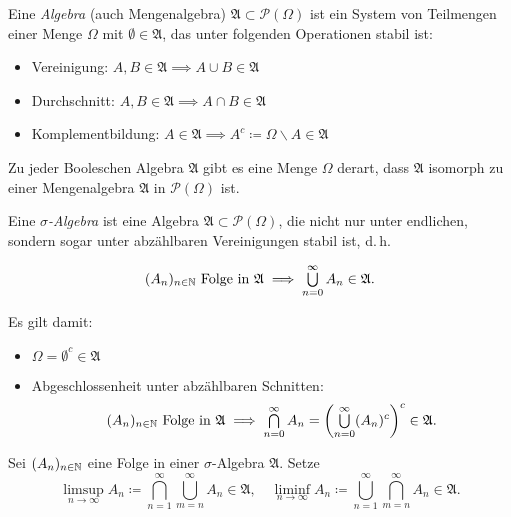 \documentclass{cheat-sheet}
\begin{document}
\begin{defn}
  Eine \emph{Algebra} (auch Mengenalgebra) $\mathfrak{A} \subset \mathcal{P}(\Omega)$ ist ein System von Teilmengen einer Menge $\Omega$ mit $\emptyset \in \mathfrak{A}$, das unter folgenden Operationen stabil ist:
  \begin{itemize}
    \item Vereinigung: $A, B \in \mathfrak{A} \implies A \cup B \in \mathfrak{A}$
    \item Durchschnitt: $A, B \in \mathfrak{A} \implies A \cap B \in \mathfrak{A}$
    \item Komplementbildung: $A \in \mathfrak{A} \implies A^c \coloneqq \Omega \backslash A \in \mathfrak{A}$
  \end{itemize}
\end{defn}

\begin{satz}
Zu jeder Booleschen Algebra $\mathfrak{A}$ gibt es eine Menge $\Omega$ derart, dass $\mathfrak{A}$ isomorph zu einer Mengenalgebra $\mathfrak{A}$ in $\mathcal{P}(\Omega)$ ist.
\end{satz}

\begin{defn}
  Eine \emph{$\sigma$-Algebra} ist eine Algebra $\mathfrak{A} \subset \mathcal{P}(\Omega)$, die nicht nur unter endlichen, sondern sogar unter abzählbaren Vereinigungen stabil ist, d.\,h.

  \[ (A_n)_{n \in \N} \text{ Folge in } \mathfrak{A} \implies \bigcup_{n = 0}^{\infty} A_n \in \mathfrak{A}. \]
\end{defn}

\begin{bem}
  Es gilt damit:

  \begin{itemize}
    \item $\Omega = \emptyset^c \in \mathfrak{A}$
    \item Abgeschlossenheit unter abzählbaren Schnitten:
  \[ (A_n)_{n \in \N} \text{ Folge in } \mathfrak{A} \implies \bigcap_{n = 0}^{\infty} A_n = \left( \bigcup_{n = 0}^{\infty} (A_n)^c \right)^c \in \mathfrak{A}. \]
  \end{itemize}
\end{bem}

\begin{defn}
  Sei $(A_n)_{n \in \mathbb{N}}$ eine Folge in einer $\sigma$-Algebra $\mathfrak{A}$. Setze
  \[
    \limsup_{n \to \infty} A_n \coloneqq \bigcap_{n = 1}^{\infty} \bigcup_{m = n}^{\infty} A_n \in \mathfrak{A}, \quad
    \liminf_{n \to \infty} A_n \coloneqq \bigcup_{n = 1}^{\infty} \bigcap_{m = n}^{\infty} A_n \in \mathfrak{A}.
  \]
\end{defn}
\end{document}
